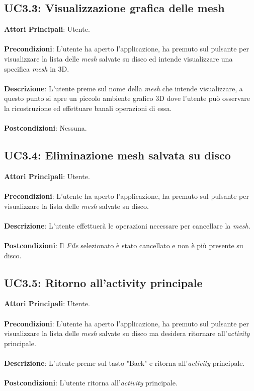 \subsection{UC3.3: Visualizzazione grafica delle mesh}
\textbf{Attori Principali}: Utente.
\\\\ \textbf{Precondizioni}: L'utente ha aperto l'applicazione, ha premuto sul pulsante per visualizzare la lista delle \emph{mesh} salvate su disco ed intende visualizzare una specifica \emph{mesh} in 3D.
\\\\ \textbf{Descrizione}: L'utente preme sul nome della \emph{mesh} che intende visualizzare, a questo punto si apre un piccolo ambiente grafico 3D dove l'utente può osservare la ricostruzione ed effettuare banali operazioni di essa.
\\\\ \textbf{Postcondizioni}: Nessuna.

\subsection{UC3.4: Eliminazione mesh salvata su disco}
\textbf{Attori Principali}: Utente.
\\\\ \textbf{Precondizioni}: L'utente ha aperto l'applicazione, ha premuto sul pulsante per visualizzare la lista delle \emph{mesh} salvate su disco.
\\\\ \textbf{Descrizione}: L'utente effettuerà le operazioni necessare per cancellare la \emph{mesh}.
\\\\ \textbf{Postcondizioni}: Il \emph{File} selezionato è stato cancellato e non è più presente su disco.

\subsection{UC3.5: Ritorno all'activity principale}
\textbf{Attori Principali}: Utente.
\\\\ \textbf{Precondizioni}: L'utente ha aperto l'applicazione, ha premuto sul pulsante per visualizzare la lista delle \emph{mesh} salvate su disco ma desidera ritornare all'\emph{activity} principale.
\\\\ \textbf{Descrizione}: L'utente preme sul tasto "Back" e ritorna all'\emph{activity} principale.
\\\\ \textbf{Postcondizioni}: L'utente ritorna all'\emph{activity} principale.


